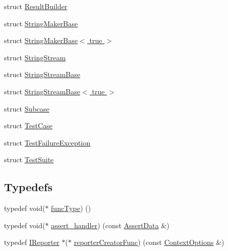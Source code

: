 \begin{DoxyCompactItemize}
struct \hyperlink{structdoctest_1_1detail_1_1_result_builder}{Result\+Builder}
\item 
struct \hyperlink{structdoctest_1_1detail_1_1_string_maker_base}{String\+Maker\+Base}
\item 
struct \hyperlink{structdoctest_1_1detail_1_1_string_maker_base_3_01true_01_4}{String\+Maker\+Base$<$ true $>$}
\item 
struct \hyperlink{structdoctest_1_1detail_1_1_string_stream}{String\+Stream}
\item 
struct \hyperlink{structdoctest_1_1detail_1_1_string_stream_base}{String\+Stream\+Base}
\item 
struct \hyperlink{structdoctest_1_1detail_1_1_string_stream_base_3_01true_01_4}{String\+Stream\+Base$<$ true $>$}
\item 
struct \hyperlink{structdoctest_1_1detail_1_1_subcase}{Subcase}
\item 
struct \hyperlink{structdoctest_1_1detail_1_1_test_case}{Test\+Case}
\item 
struct \hyperlink{structdoctest_1_1detail_1_1_test_failure_exception}{Test\+Failure\+Exception}
\item 
struct \hyperlink{structdoctest_1_1detail_1_1_test_suite}{Test\+Suite}
\end{DoxyCompactItemize}
\subsection*{Typedefs}
\begin{DoxyCompactItemize}
\item 
typedef void($\ast$ \hyperlink{namespacedoctest_1_1detail_a7b2c60631c5f4906b26acf2e6b0e6e45}{func\+Type}) ()
\item 
typedef void($\ast$ \hyperlink{namespacedoctest_1_1detail_a5b5db6997f20389de5735e3ee3439b95}{assert\+\_\+handler}) (const \hyperlink{structdoctest_1_1_assert_data}{Assert\+Data} \&)
\item 
typedef \hyperlink{structdoctest_1_1_i_reporter}{I\+Reporter} $\ast$($\ast$ \hyperlink{namespacedoctest_1_1detail_a030c0c44c25bdebe6a83858d1f454f72}{reporter\+Creator\+Func}) (const \hyperlink{structdoctest_1_1_context_options}{Context\+Options} \&)
\end{DoxyCompactItemize}
